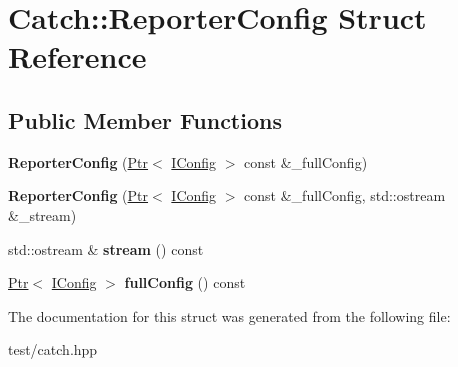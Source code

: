 \hypertarget{structCatch_1_1ReporterConfig}{}\section{Catch\+:\+:Reporter\+Config Struct Reference}
\label{structCatch_1_1ReporterConfig}
\subsection*{Public Member Functions}
\begin{DoxyCompactItemize}
\item 
{\bfseries Reporter\+Config} (\hyperlink{classCatch_1_1Ptr}{Ptr}$<$ \hyperlink{structCatch_1_1IConfig}{I\+Config} $>$ const \&\+\_\+full\+Config)\hypertarget{structCatch_1_1ReporterConfig_aae30a67f41d2b2fecd57f42f54649caa}{}\label{structCatch_1_1ReporterConfig_aae30a67f41d2b2fecd57f42f54649caa}

\item 
{\bfseries Reporter\+Config} (\hyperlink{classCatch_1_1Ptr}{Ptr}$<$ \hyperlink{structCatch_1_1IConfig}{I\+Config} $>$ const \&\+\_\+full\+Config, std\+::ostream \&\+\_\+stream)\hypertarget{structCatch_1_1ReporterConfig_aadf290549fd003a753b938d824e75667}{}\label{structCatch_1_1ReporterConfig_aadf290549fd003a753b938d824e75667}

\item 
std\+::ostream \& {\bfseries stream} () const \hypertarget{structCatch_1_1ReporterConfig_a6ac1cce9cdc14d4df5d3cea096c0910e}{}\label{structCatch_1_1ReporterConfig_a6ac1cce9cdc14d4df5d3cea096c0910e}

\item 
\hyperlink{classCatch_1_1Ptr}{Ptr}$<$ \hyperlink{structCatch_1_1IConfig}{I\+Config} $>$ {\bfseries full\+Config} () const \hypertarget{structCatch_1_1ReporterConfig_a1d12c4a0a6c0c5619a3c8a12cf6fbf1d}{}\label{structCatch_1_1ReporterConfig_a1d12c4a0a6c0c5619a3c8a12cf6fbf1d}

\end{DoxyCompactItemize}


The documentation for this struct was generated from the following file\+:\begin{DoxyCompactItemize}
\item 
test/catch.\+hpp\end{DoxyCompactItemize}
